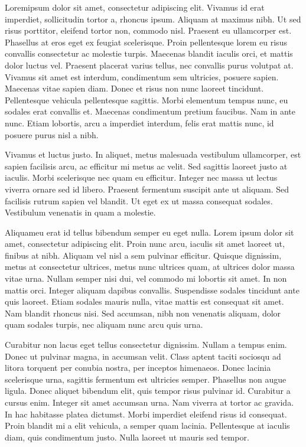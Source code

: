 \documentclass[twoside]{article}
\begin{document}
\begin{pages}
\begin{Leftside}
    \endnumbering
  \end{Leftside}

  \begin{Rightside}
    \beginnumbering
    \autopar
    Lorem\footnoteAmk ipsum dolor sit amet, consectetur adipiscing elit. Vivamus id erat imperdiet, sollicitudin tortor a, rhoncus ipsum. Aliquam at maximus nibh. Ut sed risus porttitor, eleifend tortor non, commodo nisl. Praesent eu ullamcorper est. Phasellus at eros eget ex feugiat scelerisque. Proin pellentesque lorem eu risus convallis consectetur ac molestie turpis. Maecenas blandit iaculis orci, et mattis dolor luctus vel. Praesent placerat varius tellus, nec convallis purus volutpat at. Vivamus sit amet est interdum, condimentum sem ultricies, posuere sapien. Maecenas vitae sapien diam. Donec et risus non nunc laoreet tincidunt. Pellentesque vehicula pellentesque sagittis. Morbi elementum tempus nunc, eu sodales erat convallis et. Maecenas condimentum pretium faucibus. Nam in ante nunc. Etiam lobortis, arcu a imperdiet interdum, felis erat mattis nunc, id posuere purus nisl a nibh.

	Vivamus et luctus justo. In aliquet, metus malesuada vestibulum ullamcorper, est sapien facilisis arcu, ac efficitur mi metus ac velit. Sed sagittis laoreet justo at iaculis. Morbi scelerisque nec quam eu efficitur. Integer nec massa ut lectus viverra ornare sed id libero. Praesent fermentum suscipit ante ut aliquam. Sed facilisis rutrum sapien vel blandit. Ut eget ex ut massa consequat sodales. Vestibulum venenatis in quam a molestie.

	Aliquam\footnoteAmk eu erat id tellus bibendum semper eu eget nulla. Lorem ipsum dolor sit amet, consectetur adipiscing elit. Proin nunc arcu, iaculis sit amet laoreet ut, finibus at nibh. Aliquam vel nisl a sem pulvinar efficitur. Quisque dignissim, metus at consectetur ultrices, metus nunc ultrices quam, at ultrices dolor massa vitae urna. Nullam semper nisi dui, vel commodo mi lobortis sit amet. In non mattis orci. Integer aliquam dapibus convallis. Suspendisse sodales tincidunt ante quis laoreet. Etiam sodales mauris nulla, vitae mattis est consequat sit amet. Nam blandit rhoncus nisi. Sed accumsan, nibh non venenatis aliquam, dolor quam sodales turpis, nec aliquam nunc arcu quis urna.

	Curabitur non lacus eget tellus consectetur dignissim. Nullam a tempus enim. Donec ut pulvinar magna, in accumsan velit. Class aptent taciti sociosqu ad litora torquent per conubia nostra, per inceptos himenaeos. Donec lacinia scelerisque urna, sagittis fermentum est ultricies semper. Phasellus non augue ligula. Donec aliquet bibendum elit, quis tempor risus pulvinar id. Curabitur a cursus enim. Integer sit amet accumsan urna. Nam viverra at tortor ac gravida. In hac habitasse platea dictumst. Morbi imperdiet eleifend risus id consequat. Proin blandit mi a elit vehicula, a semper quam lacinia. Pellentesque at iaculis diam, quis condimentum justo. Nulla laoreet ut mauris sed tempor.


\end{Rightside}
\end{pages}
\end{document}
